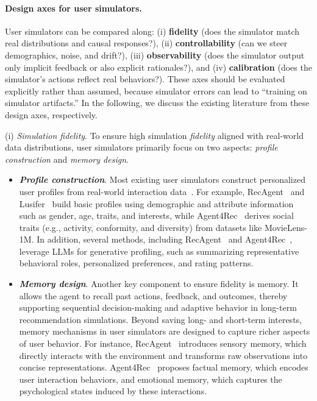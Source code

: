 \paragraph{\textbf{Design axes for user simulators.}}
User simulators can be compared along:
(i) \textbf{fidelity} (does the simulator match real distributions and causal responses?),
(ii) \textbf{controllability} (can we steer demographics, noise, and drift?),
(iii) \textbf{observability} (does the simulator output only implicit feedback or also explicit rationales?),
and (iv) \textbf{calibration} (does the simulator’s actions reflect real behaviors?).
These axes should be evaluated explicitly rather than assumed, because simulator errors can lead to “training on simulator artifacts.” 
In the following, we discuss the existing literature from these design axes, respectively. 


(i) \emph{Simulation fidelity}. To ensure high simulation \emph{fidelity} aligned with real-world data distributions, user simulators primarily focus on two aspects: {\textit{profile construction}} and {\textit{memory design}}.
\begin{itemize}
    \item \textbf{\textit{Profile construction}}. Most existing user simulators construct personalized user profiles from real-world interaction data~\cite{wanyan2025temporal,liu2025diagnostic}. For example, RecAgent~\cite{recagent} and Lusifer~\cite{ebrat2025lusifer} build basic profiles using demographic and attribute information such as gender, age, traits, and interests, while Agent4Rec~\cite{zhang2024agent4rec} derives social traits (e.g., activity, conformity, and diversity) from datasets like MovieLens-1M. In addition, several methods, including RecAgent~\cite{wang2023recagent} and Agent4Rec~\cite{zhang2024agent4rec}, leverage LLMs for generative profiling, such as summarizing representative behavioral roles, personalized preferences, and rating patterns.
    \item \textbf{\textit{Memory design}}. Another key component to ensure fidelity is memory. It allows the agent to recall past actions, feedback, and outcomes, thereby supporting sequential decision-making and adaptive behavior in long-term recommendation simulations. 
    Beyond saving long- and short-term interests, memory mechanisms in user simulators are designed to capture richer aspects of user behavior. For instance, RecAgent~\cite{recagent} introduces sensory memory, which directly interacts with the environment and transforms raw observations into concise representations. Agent4Rec~\cite{zhang2024agent4rec} proposes factual memory, which encodes user interaction behaviors, and emotional memory, which captures the psychological states induced by these interactions.
\end{itemize}


